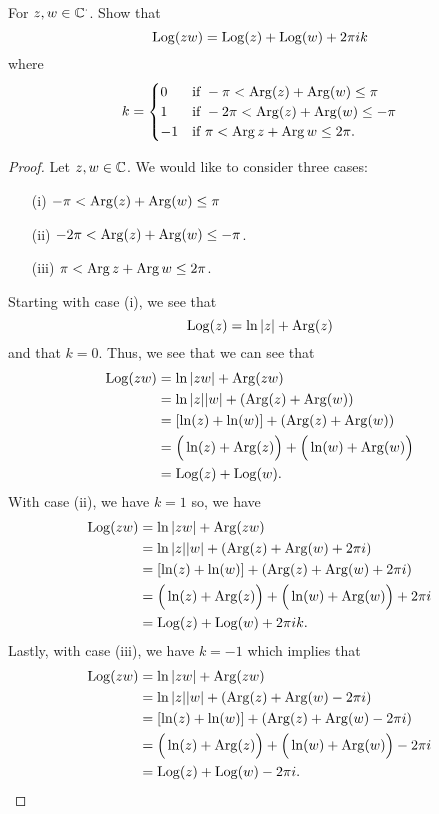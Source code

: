 \documentclass[a4paper]{article}
\begin{document}
For \( z,w \in \mathbb{C}^{\cdot} \). Show that 
\[  \operatorname{Log}(zw) = \operatorname{Log}(z) + \operatorname{Log}(w) + 2 \pi i k  \]
where 
\[  k = 
\begin{cases}
    0 &\text{if} \ - \pi < \operatorname{Arg}(z) + \operatorname{Arg}(w) \leq \pi \\ 
    1 &\text{if} \ -2 \pi < \operatorname{Arg}(z) + \operatorname{Arg}(w) \leq - \pi \\
    -1 &\text{if} \ \pi < \operatorname{Arg} z + \operatorname{Arg} w \leq 2 \pi.
\end{cases} \]
\begin{proof}
Let \( z,w \in \mathbb{C}  \). We would like to consider three cases: 
    \begin{enumerate}
        \item[(i)] \( - \pi < \operatorname{Arg}(z) + \operatorname{Arg}(w) \leq \pi \)
        \item[(ii)] \( -2 \pi < \operatorname{Arg}(z) + \operatorname{Arg}(w) \leq - \pi \).
        \item[(iii)] \( \pi < \operatorname{Arg} z + \operatorname{Arg} w \leq 2 \pi \). 
    \end{enumerate}
Starting with case (i), we see that
\[  \operatorname{Log}(z) = \ln | z |  + \operatorname{Arg}(z) \]
and that \( k = 0  \). Thus, we see that 
we can see that 
\begin{align*}
    \operatorname{Log}(zw) &= \ln | zw |  + \operatorname{Arg}(zw) \\
             &= \ln | z | | w |  + (\operatorname{Arg}(z) + \operatorname{Arg}(w) ) \\
             &= [\ln(z) + \ln(w)] + (\operatorname{Arg}(z) + \operatorname{Arg}(w) )\\  
             &= \Big(  \ln(z) + \operatorname{Arg}(z)  \Big) + \Big(  \ln(w) + \operatorname{Arg}(w) \Big)\\
             &= \operatorname{Log}(z) + \operatorname{Log}(w). 
\end{align*}
With case (ii), we have \( k = 1  \) so, we have
\begin{align*}
    \operatorname{Log}(zw) &= \ln | zw |  + \operatorname{Arg}(zw) \\
             &= \ln | z | | w |  + (\operatorname{Arg}(z) + \operatorname{Arg}(w) + 2\pi i ) \\
             &= [\ln(z) + \ln(w)] + (\operatorname{Arg}(z) + \operatorname{Arg}(w) + 2\pi i )\\  
             &= \Big(  \ln(z) + \operatorname{Arg}(z)  \Big) + \Big(  \ln(w) + \operatorname{Arg}(w) \Big) + 2\pi i   \\
             &= \operatorname{Log}(z) + \operatorname{Log}(w) + 2\pi i k. 
\end{align*}
Lastly, with case (iii), we have \( k = -1 \) which implies that 
\begin{align*}
    \operatorname{Log}(zw) &= \ln | zw |  + \operatorname{Arg}(zw) \\
             &= \ln | z | | w |  + (\operatorname{Arg}(z) + \operatorname{Arg}(w) - 2\pi i ) \\
             &= [\ln(z) + \ln(w)] + (\operatorname{Arg}(z) + \operatorname{Arg}(w) - 2\pi i )\\  
             &= \Big(  \ln(z) + \operatorname{Arg}(z)  \Big) + \Big(  \ln(w) + \operatorname{Arg}(w) \Big) - 2\pi i   \\
             &= \operatorname{Log}(z) + \operatorname{Log}(w) - 2\pi i . 
\end{align*}

\end{proof}
\end{document}
